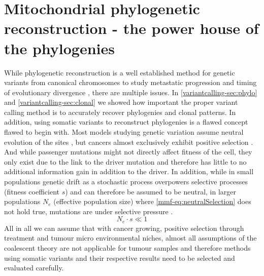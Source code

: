 \section[Mitochondrial phylogenetic reconstruction]{Mitochondrial phylogenetic reconstruction - the power house of the phylogenies}
\label{cascade-sec:mitochondria}

While phylogenetic reconstruction is a well established method for genetic variants from canonical chromosomes to study metastatic progression and timing of evolutionary divergence \cite{Deshwar2015,Brown2017,Hu2019}, there are multiple issues. In \autoref{variantcalling-sec:phylo} and \autoref{variantcalling-sec:clonal} we showed how important the proper variant calling method is to accurately recover phylogenies and clonal patterns. In addition, using somatic variants to reconstruct phylogenies is a flawed concept flawed to begin with. Most models studying genetic variation assume neutral evolution of the sites \cite{Kimura1968,Lynch1989}, but cancers almost exclusively exhibit positive selection \cite{Cannataro2018}. And while passenger mutations might not directly affect fitness of the cell, they only exist due to the link to the driver mutation and therefore has little to no additional information gain in addition to the driver. In addition, while in small populations genetic drift as a stochastic process overpowers selective processes (fitness coefficient $s$) and can therefore be assumed to be neutral, in larger populations $N_e$ (effective population size) where \autoref{mmf-eq:neutralSelection} does not hold true, mutations are under selective pressure \cite{EyreWalker2007}.
\begin{equation}
N_e \cdot s \ll 1 \label{mmf-eq:neutralSelection}
\end{equation}
\myequation[\ref{mmf-eq:neutralSelection}]{Selective pressure with effective population size}
\vspace{-3em}
All in all we can assume that with cancer growing, positive selection through treatment and tumour micro environmental niches, almost all assumptions of the coalescent theory are not applicable for tumour samples and therefore methods using somatic variants and their respective results need to be selected and evaluated carefully.

